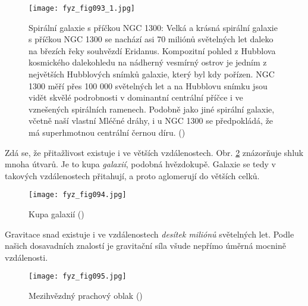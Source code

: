     \begin{figure}[ht!]  %
      \centering
      \texttt{[image: fyz\_fig093\_1.jpg]}
      \caption{Spirální galaxie s příčkou NGC 1300: Velká a krásná spirální galaxie s příčkou NGC
       1300 se nachází asi 70 miliónů světelných let daleko na březích řeky souhvězdí Eridanus.
       Kompozitní pohled z Hubblova kosmického dalekohledu na nádherný vesmírný ostrov je jedním z
       největších Hubblových snímků galaxie, který byl kdy pořízen. NGC 1300 měří přes 100 000
       světelných let a na Hubblovu snímku jsou vidět skvělé podrobnosti v dominantní centrální
       příčce i ve vznešených spirálních ramenech.  Podobně jako jiné spirální galaxie, včetně naší
       vlastní Mléčné dráhy, i u NGC 1300 se předpokládá, že má superhmotnou centrální černou díru.
       (\cite[s.~99]{Feynman01})}
      \label{fyz:fig093}
    \end{figure}
    
    Zdá se, že přitažlivost existuje i ve větších vzdálenostech. Obr. \ref{fyz:fig094} znázorňuje 
    shluk mnoha  útvarů. Je to kupa \emph{galaxií}, podobná hvězdokupě. Galaxie se 
    tedy v takových vzdálenostech přitahují, a proto aglomerují do větších celků.

    \begin{figure}[ht!]  %
      \centering
      \texttt{[image: fyz\_fig094.jpg]}
      \caption{Kupa galaxií (\cite[s.~100]{Feynman01})}
      \label{fyz:fig094}
    \end{figure}
    
    Gravitace snad existuje i ve vzdálenostech \emph{desítek miliónů} světelných let. Podle našich 
    dosavadních znalostí je gravitační síla všude nepřímo úměrná mocnině vzdálenosti. 

    \begin{figure}[ht!]  %
      \centering
      \texttt{[image: fyz\_fig095.jpg]}
      \caption{Mezihvězdný prachový oblak (\cite[s.~101]{Feynman01})}
      \label{fyz:fig095}
    \end{figure}
    
